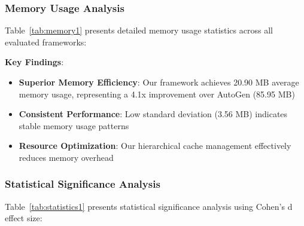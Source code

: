 \documentclass[conference]{IEEEtran}
\begin{document}
\subsubsection{Memory Usage Analysis}

Table~\ref{tab:memory1} presents detailed memory usage statistics across all evaluated frameworks:

\begin{table}[htbp]
\caption{Memory Usage Comparison (MB)}
\label{tab:memory1}
\centering
{}
\end{table}

\textbf{Key Findings}:
\begin{itemize}
\item \textbf{Superior Memory Efficiency}: Our framework achieves 20.90 MB average memory usage, representing a 4.1x improvement over AutoGen (85.95 MB)
\item \textbf{Consistent Performance}: Low standard deviation (3.56 MB) indicates stable memory usage patterns
\item \textbf{Resource Optimization}: Our hierarchical cache management effectively reduces memory overhead
\end{itemize}

\subsubsection{Statistical Significance Analysis}

Table~\ref{tab:statistics1} presents statistical significance analysis using Cohen's d effect size:

\begin{table}[htbp]
\caption{Statistical Significance Analysis}
\label{tab:statistics1}
\centering
{}
\end{table}
\end{document}
